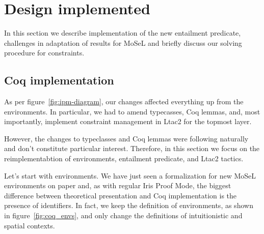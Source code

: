 \begin{itemize}


\end{itemize}

\section{Design implemented}

In this section we describe implementation of the new entailment predicate, challenges in adaptation of \citet{harlandResourceDistributionBooleanConstraints2003} results for MoSeL and briefly discuss our solving procedure for constraints.

\subsection{Coq implementation}
\label{subsec:ipm_constr_coq_implementation}

As per figure~\ref{fig:ipm-diagram}, our changes affected everything up from the environments.
In particular, we had to amend typecasses, Coq lemmas, and, most importantly, implement constraint management in Ltac2 for the topmost layer.

However, the changes to typeclasses and Coq lemmas were following naturally and don't constitute particular interest.
Therefore, in this section we focus on the reimplementabtion of environments, entailment predicate, and Ltac2 tactics.

Let's start with environments.
We have just seen a formalization for new MoSeL environments on paper and, as with regular Iris Proof Mode, the biggest difference between theoretical presentation and Coq implementation is the presence of identifiers.
In fact, we keep the definition of environments, as shown in figure~\ref{fig:coq_envs}, and only change the definitions of intuitionistic and spatial contexts.

